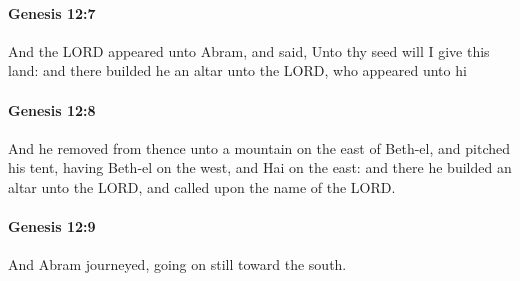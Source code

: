 		\paragraph{Genesis 12:7} %
			\label{GENESIS-12-7}

			And the LORD appeared unto Abram, and said, Unto thy seed will I give this land: and there builded he an altar unto the LORD, who appeared unto hi


		\paragraph{Genesis 12:8} %
			\label{GENESIS-12-8}

			And he removed from thence unto a mountain on the east of Beth-el, and pitched his tent, having Beth-el on the west, and Hai on the east: and there he builded an altar unto the LORD, and called upon the name of the LORD.


		\paragraph{Genesis 12:9} %
			\label{GENESIS-12-9}

			And Abram journeyed, going on still toward the south.


